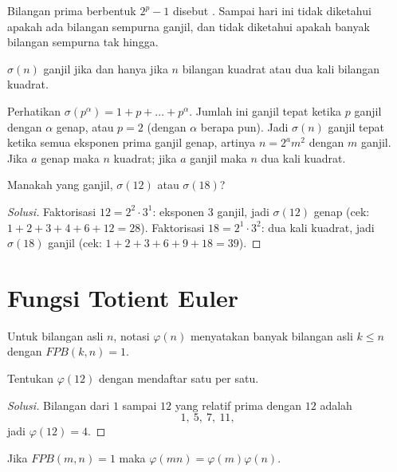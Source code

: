\documentclass[12pt]{scrartcl}
\begin{document}
\begin{remark}
Bilangan prima berbentuk $2^p - 1$ disebut .
Sampai hari ini tidak diketahui apakah ada bilangan sempurna ganjil,
dan tidak diketahui apakah banyak bilangan sempurna tak hingga.
\end{remark}

\begin{fact}
$\sigma(n)$ ganjil jika dan hanya jika $n$ bilangan kuadrat
atau dua kali bilangan kuadrat.
\end{fact}

Perhatikan $\sigma(p^\alpha) = 1 + p + \dots + p^\alpha$.
Jumlah ini ganjil tepat ketika $p$ ganjil dengan $\alpha$ genap,
atau $p = 2$ (dengan $\alpha$ berapa pun).
Jadi $\sigma(n)$ ganjil tepat ketika semua eksponen prima ganjil genap,
artinya $n = 2^a m^2$ dengan $m$ ganjil.
Jika $a$ genap maka $n$ kuadrat; jika $a$ ganjil maka $n$ dua kali kuadrat.

\begin{example}
Manakah yang ganjil, $\sigma(12)$ atau $\sigma(18)$?
\end{example}
\begin{proof}[Solusi]
Faktorisasi $12 = 2^2 \cdot 3^1$: eksponen $3$ ganjil, jadi $\sigma(12)$ genap
(cek: $1 + 2 + 3 + 4 + 6 + 12 = 28$).
Faktorisasi $18 = 2^1 \cdot 3^2$: dua kali kuadrat, jadi $\sigma(18)$ ganjil
(cek: $1 + 2 + 3 + 6 + 9 + 18 = 39$).
\end{proof}

\section{Fungsi Totient Euler}

\begin{definition}
Untuk bilangan asli $n$, notasi $\varphi(n)$ menyatakan banyak bilangan asli
$k \le n$ dengan $FPB(k, n) = 1$.
\end{definition}

\begin{example}
Tentukan $\varphi(12)$ dengan mendaftar satu per satu.
\end{example}
\begin{proof}[Solusi]
Bilangan dari $1$ sampai $12$ yang relatif prima dengan $12$ adalah
\[ 1,\ 5,\ 7,\ 11, \]
jadi $\varphi(12) = 4$.
\end{proof}

\begin{theorem}
Jika $FPB(m, n) = 1$ maka $\varphi(mn) = \varphi(m)\varphi(n)$.
\end{theorem}
\end{document}
